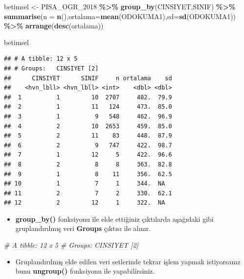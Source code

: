 \documentclass[
  oneside]{book}
\newenvironment{Shaded}{\begin{snugshade}}{\end{snugshade}}
\newcommand{\AttributeTok}[1]{\textcolor[rgb]{0.13,0.29,0.53}{#1}}
\newcommand{\CommentTok}[1]{\textcolor[rgb]{0.56,0.35,0.01}{\textit{#1}}}
\newcommand{\FunctionTok}[1]{\textcolor[rgb]{0.13,0.29,0.53}{\textbf{#1}}}
\newcommand{\NormalTok}[1]{#1}
\newcommand{\OtherTok}[1]{\textcolor[rgb]{0.56,0.35,0.01}{#1}}
\newcommand{\SpecialCharTok}[1]{\textcolor[rgb]{0.81,0.36,0.00}{\textbf{#1}}}
\providecommand{\tightlist}{%
  \setlength{\itemsep}{0pt}\setlength{\parskip}{0pt}}
\begin{document}
\begin{Shaded}
\begin{Highlighting}[]
\NormalTok{betimsel  }\OtherTok{\textless{}{-}}\NormalTok{ PISA\_OGR\_2018 }\SpecialCharTok{\%\textgreater{}\%}
  \FunctionTok{group\_by}\NormalTok{(CINSIYET,SINIF) }\SpecialCharTok{\%\textgreater{}\%}
  \FunctionTok{summarise}\NormalTok{(}\AttributeTok{n =} \FunctionTok{n}\NormalTok{(),}\AttributeTok{ortalama=}\FunctionTok{mean}\NormalTok{(ODOKUMA1),}\AttributeTok{sd=}\FunctionTok{sd}\NormalTok{(ODOKUMA1)) }\SpecialCharTok{\%\textgreater{}\%}  
  \FunctionTok{arrange}\NormalTok{(}\FunctionTok{desc}\NormalTok{(ortalama)) }

\NormalTok{betimsel}
\end{Highlighting}
\end{Shaded}

\begin{verbatim}
## # A tibble: 12 x 5
## # Groups:   CINSIYET [2]
##      CINSIYET      SINIF     n ortalama    sd
##    <hvn_lbll> <hvn_lbll> <int>    <dbl> <dbl>
##  1          1         10  2707     482.  79.9
##  2          1         11   124     473.  85.0
##  3          1          9   548     462.  96.9
##  4          2         10  2653     459.  85.0
##  5          2         11    83     448.  87.9
##  6          2          9   747     422.  98.7
##  7          1         12     5     422.  96.6
##  8          2          8     8     363.  82.8
##  9          1          8    11     356.  62.5
## 10          1          7     1     344.  NA  
## 11          2          7     2     330.  62.1
## 12          2         12     1     322.  NA
\end{verbatim}

\begin{itemize}
\tightlist
\item
  \textbf{group\_by()} fonksiyonu ile elde ettiğiniz çıktılarda aşağıdaki gibi
  gruplandırılmış veri \textbf{Groups} çıktısı ile alınır.
\end{itemize}

\begin{Shaded}
\begin{Highlighting}[]
\CommentTok{\# A tibble: 12 x 5}
\CommentTok{\# Groups:   CINSIYET [2]}
\end{Highlighting}
\end{Shaded}

\begin{itemize}
\tightlist
\item
  Gruplandırılmış elde edilen veri setlerinde tekrar işlem yapmak istiyorsanız bunu \textbf{ungroup()} fonksiyonu ile yapabilirsiniz.
\end{itemize}
\end{document}
